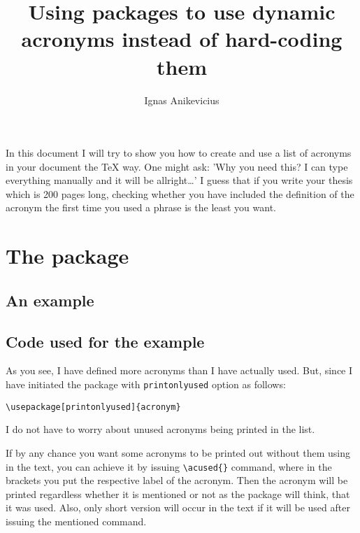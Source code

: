 \documentclass[
    draft
]{scrartcl}
\title{Using packages to use dynamic acronyms instead of hard-coding them}
\author{Ignas Anikevicius}
\begin{document}
\maketitle
\tableofcontents
\listoftodos

%
In this document I will try to show you how to create and use a list of acronyms
    in your document the \TeX{} way.
%
One might ask: 'Why you need this? I can type everything manually and it will be
    allright\ldots'
%
I guess that if you write your thesis which is 200 pages long, checking whether
    you have included the definition of the acronym the first time you used a
    phrase is the least you want.

\section{The  package}

%
\subsection{An example}

%


%
\subsection{Code used for the example}

%


%
As you see, I have defined more acronyms than I have actually used.
%
But, since I have initiated the package with \verb|printonlyused| option as
    follows:
\begin{lstlisting}
\usepackage[printonlyused]{acronym}
\end{lstlisting}
    I do not have to worry about unused acronyms being printed in the list.

%
If by any chance you want some acronyms to be printed out without them using in
    the text, you can achieve it by issuing \verb|\acused{}| command, where in
    the brackets you put the respective label of the acronym.
%
Then the acronym will be printed regardless whether it is mentioned or
    not as the package will think, that it was used.
%
Also, only short version will occur in the text if it will be used after issuing
    the mentioned command.
\end{document}
